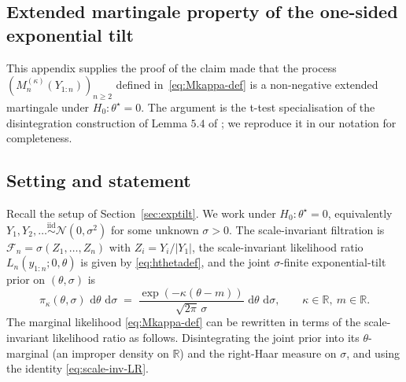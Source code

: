\documentclass[numsec,webpdf,modern,medium,namedate]{oup-authoring-template}
\theoremstyle{thmstyleone}%
\theoremstyle{thmstyletwo}%
\theoremstyle{thmstylethree}%
\newcommand{\E}{\mathbb{E}}
\newcommand{\dd}{\,\mathrm{d}}
\newcommand{\1}{\mathbf{1}}
\begin{document}
\begin{appendices}
\section{Extended martingale property of the one-sided exponential tilt}
\label{app:extended-mg}
This appendix supplies the proof of the claim made that the process \((M_n^{(\kappa)}(Y_{1:n}))_{n\geq 2}\) defined in~\eqref{eq:Mkappa-def} is a non-negative extended martingale under \(H_0:\theta^\star=0\). The
argument is the t-test specialisation of the disintegration construction of Lemma $5.4$ of \cite{Wang2025}; we reproduce it in our notation for completeness.



\subsection{Setting and statement}

Recall the setup of Section~\ref{sec:exptilt}. We work under \(H_0:\theta^\star=0\),
equivalently \(Y_1,Y_2,\ldots\stackrel{\mathrm{iid}}{\sim}\mathcal{N}(0,\sigma^2)\)
for some unknown \(\sigma>0\). The scale-invariant filtration is
\(\mathcal{F}_n=\sigma(Z_1,\ldots,Z_n)\) with \(Z_i=Y_i/|Y_1|\), the
scale-invariant likelihood ratio \(L_n(y_{1:n};0,\theta)\) is given by
\eqref{eq:hthetadef}, and the joint \(\sigma\)-finite exponential-tilt prior on \((\theta,\sigma)\) is
\[
\pi_\kappa(\theta,\sigma)\,\dd\theta\,\dd\sigma
\;=\;\frac{\exp(-\kappa(\theta-m))}{\sqrt{2\pi}\,\sigma}\,
\dd\theta\,\dd\sigma,
\qquad \kappa\in\mathbb{R},\ m\in\mathbb{R}.
\]
The marginal likelihood \eqref{eq:Mkappa-def} can be rewritten in terms of the scale-invariant likelihood ratio as follows. Disintegrating the joint prior into its \(\theta\)-marginal (an improper density on \(\mathbb{R}\)) and the right-Haar measure on \(\sigma\), and using the identity \eqref{eq:scale-inv-LR}. 


\end{appendices}
\end{document}
